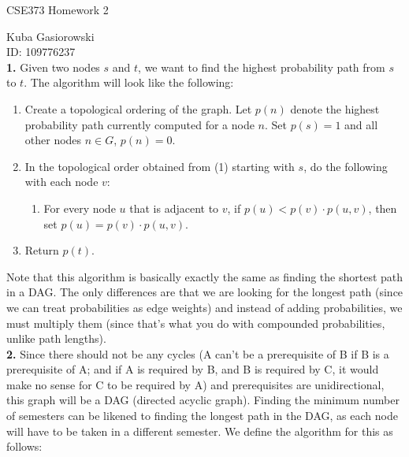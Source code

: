 \documentclass[12pt]{report}
\newcommand{\no}{\noindent}
\begin{document}
	
	\Large
	\centering
	CSE373 Homework 2
	
	\justify
	\normalsize
	
	Kuba Gasiorowski\\
	ID: 109776237\\
	
	\no \textbf{1. } Given two nodes $s$ and $t$, we want to find the highest probability path from $s$ to $t$. The algorithm will look like the following:
	
	\begin{enumerate}
		\item Create a topological ordering of the graph. Let $p(n)$ denote the highest probability path currently computed for a node $n$. Set $p(s) = 1$ and all other nodes $n \in G$, $p(n) = 0$.
		\item In the topological order obtained from (1) starting with $s$, do the following with each node $v$:
		\begin{enumerate}
			\item For every node $u$ that is adjacent to $v$, if $p(u) < p(v) \cdot p(u,v)$, then set $p(u) = p(v) \cdot p(u,v)$.
		\end{enumerate}
		\item Return $p(t)$.
	\end{enumerate}
	
	\no Note that this algorithm is basically exactly the same as finding the shortest path in a DAG. The only differences are that we are looking for the longest path (since we can treat probabilities as edge weights) and instead of adding probabilities, we must multiply them (since that's what you do with compounded probabilities, unlike path lengths).\\
	
	\no \textbf{2.} Since there should not be any cycles (A can't be a prerequisite of B if B is a prerequisite of A; and if A is required by B, and B is required by C, it would make no sense for C to be required by A) and prerequisites are unidirectional, this graph will be a DAG (directed acyclic graph). Finding the minimum number of semesters can be likened to finding the longest path in the DAG, as each node will have to be taken in a different semester. We define the algorithm for this as follows: 
	
\end{document}
